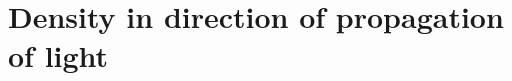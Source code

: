 










\section{Density in direction of propagation of light}\label{sect: Density in direction of propagation of light}


